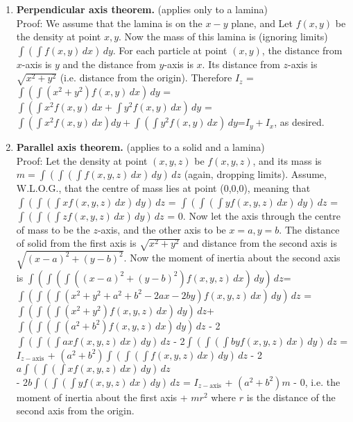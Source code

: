 \documentclass[11pt,a4paper]{article}
\begin{document}
\begin{enumerate}
\item\textbf {Perpendicular axis theorem.} (applies only to a lamina)\\
Proof: We assume that the lamina is on the $x-y$ plane, and  Let $f(x,y)$ be the density at point $x,y$. Now the mass of this lamina is (ignoring limits) $\int (\int f(x,y)\, dx)\, dy$. For each particle at point $(x,y)$, the distance from $x$-axis is $y$ and the distance from $y$-axis is $x$. Its distance from $z$-axis is $\sqrt{x^2+y^2}$ (i.e. distance from the origin). Therefore $I_{z}$ = $\int (\int (x^2+y^2)f(x,y)\, dx)\, dy$ = $\int (\int x^2f(x,y)\, dx+\int y^2f(x,y)\, dx)\, dy$ = $\int (\int x^2f(x,y)\, dx)dy+\int(\int y^2f(x,y)\, dx)\, dy$=$I_y+I_x$, as desired.
\item\textbf {Parallel axis theorem.} (applies to a solid and a lamina)\\
Proof: Let the density at point $(x,y,z)$ be $f(x,y,z)$, and its mass is $m=\int (\int(\int f(x,y,z)\,dx)\,dy)\,dz$ (again, dropping limits). Assume, W.L.O.G., that the centre of mass lies at point (0,0,0), meaning that $\int (\int(\int xf(x,y,z)\,dx)\,dy)\,dz$ = $\int (\int(\int yf(x,y,z)\,dx)\,dy)\,dz$ = $\int (\int(\int zf(x,y,z)\,dx)\,dy)\,dz$ = 0. Now let the axis through the centre of mass to be the $z$-axis, and the other axis to be $x=a, y=b$. The distance of solid from the first axis is $\sqrt{x^2+y^2}$ and distance from the second axis is $\sqrt{(x-a)^2+(y-b)^2}$. Now the moment of inertia about the second axis is $\int (\int(\int ((x-a)^2+(y-b)^2)f(x,y,z)\,dx)\,dy)\,dz$=$\int (\int(\int (x^2+y^2+a^2+b^2-2ax-2by)f(x,y,z)\,dx)\,dy)\,dz$ = $\int (\int(\int (x^2+y^2)f(x,y,z)\,dx)\,dy)\,dz$+$\int (\int(\int (a^2+b^2)f(x,y,z)\,dx)\,dy)\,dz$ - 2$\int (\int(\int axf(x,y,z)\,dx)\,dy)\,dz$ - 2$\int (\int(\int byf(x,y,z)\,dx)\,dy)\,dz$ = $I_{z-\text{axis}}$ + $(a^2+b^2)\int (\int(\int f(x,y,z)\,dx)\,dy)\,dz$ - 2$a\int (\int(\int xf(x,y,z)\,dx)\,dy)\,dz$\\ - 2$b\int (\int(\int yf(x,y,z)\,dx)\,dy)\,dz$ = $I_{z-\text{axis}}$ + $(a^2+b^2)m$ - 0, i.e. the moment of inertia about the first axis + $mr^2$ where $r$ is the distance of the second axis from the origin.
\end{enumerate}
\end{document}
